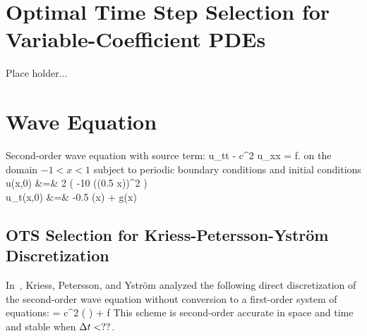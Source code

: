 \documentclass[oneeqnum,onefignum,onetabnum,onethmnum]{siamltex}
\begin{document}
\section{Optimal Time Step Selection for Variable-Coefficient PDEs}
Place holder...



\section{Wave Equation}
Second-order wave equation with source term:
\bea
    u_{tt} - c^2 u_{xx} = f.
    \label{eq:wave_eqn}
\eea
on the domain $-1 < x < 1$ subject to periodic boundary conditions and
initial conditions
\bea
  u(x,0)   &=& 2 \exp \left( -10 (\sin(0.5 \pi x))^2 \right) \nonumber \\
  u_t(x,0) &=& -0.5 \pi \sin(\pi x) + g(x)
\eea


\subsection{OTS Selection for Kriess-Petersson-Ystr\"om Discretization}
In~\cite{kreiss2002}, Kriess, Petersson, and Ystr\"om analyzed the following
direct discretization of the second-order wave equation without conversion 
to a first-order system of equations:
\bea
  = c^2 \left(  \right)
  + f
  \label{eq:wave_eqn_KPY}
\eea
This scheme is second-order accurate in space and time and stable when 
$\Delta t < ??$.
\end{document}
